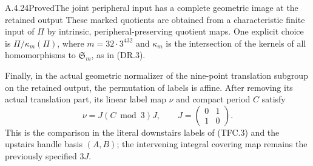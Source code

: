 \begin{result}{A.4.24}{Proved}{The joint peripheral input has a complete geometric image at the retained output}
These marked quotients are obtained from a characteristic finite
input of $\Pi$ by intrinsic, peripheral-preserving quotient maps.
One explicit choice is $\Pi/\kappa_m(\Pi)$, where
$m=32\cdot3^{432}$ and $\kappa_m$ is the intersection of the
kernels of all homomorphisms to $\mathfrak S_m$, as in (DR.3).

Finally, in the actual geometric normalizer of the nine-point
translation subgroup on the retained output, the permutation of
labels is affine.  After removing its actual translation part,
its linear label map $\nu$ and compact period $C$ satisfy
\[
                 \nu=J(C\bmod3)J,
 \qquad J=\begin{pmatrix}0&1\\1&0\end{pmatrix}.           \tag{JP.4}
\]
This is the comparison in the literal downstairs labels of
(TFC.3) and the upstairs handle basis $(A,B)$; the intervening
integral covering map remains the previously specified $3J$.
\end{result}

